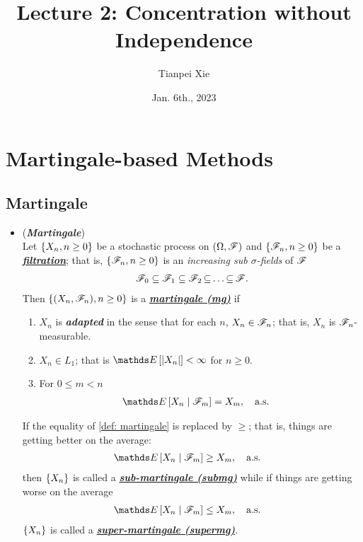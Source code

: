 \documentclass[11pt]{article}
\begin{document}
\title{Lecture 2: Concentration without Independence}
\author{ Tianpei Xie}
\date{Jan. 6th., 2023 }
\maketitle
\tableofcontents
\newpage
\section{Martingale-based Methods}
\subsection{Martingale}
\begin{itemize}
\item \begin{definition} (\emph{\textbf{Martingale}}) \citep{resnick2013probability}\\
Let $\left\{X_n, n \ge 0\right\}$ be a stochastic process on $(\Omega, {\mathscr F})$ and $\left\{{\mathscr F}_n, n \ge 0\right\}$ be a \underline{\textbf{\emph{filtration}}}; that is, $\left\{{\mathscr F}_n, n \ge 0\right\}$ is an \emph{increasing sub $\sigma$-fields} of ${\mathscr F}$
\begin{align*}
{\mathscr F}_0 \subseteq {\mathscr F}_1 \subseteq {\mathscr F}_2 \,{\subseteq}\ldots{\subseteq}\, {\mathscr F}.
\end{align*} Then $\left\{ (X_n, {\mathscr F}_n),  n \ge 0\right\}$ is a \underline{\emph{\textbf{martingale (mg)}}} if
\begin{enumerate}
\item  $X_n$ is \emph{\textbf{adapted}} in the sense that for each $n$, $X_n \in {\mathscr F}_n$; that is, $X_n$ is ${\mathscr F}_n$-measurable.
\item  $X_n \in L_1$; that is $\E{}{\abs{X_n}} < \infty$ for $n \ge 0$.
\item For $0 \le m < n$
\begin{align}
\E{}{X_n \;|\; \srF_m} &= X_m, \quad \text{a.s.} \label{def: martingale}
\end{align}
\end{enumerate}
If the equality of \eqref{def: martingale} is replaced by $\ge$; that is, things are getting better on the average:
\begin{align}
\E{}{X_n \;|\; \srF_m} &\ge X_m, \quad \text{a.s.} \label{def: sub_martingale}
\end{align} then $\left\{X_n\right\}$ is called a \underline{\emph{\textbf{sub-martingale (submg)}}} while if things are getting worse on
the average
\begin{align}
\E{}{X_n \;|\; \srF_m} &\le X_m, \quad \text{a.s.} \label{def: sup_martingale}
\end{align}  $\left\{X_n\right\}$ is called a \underline{\emph{\textbf{super-martingale (supermg)}}}.
\end{definition}


\end{itemize}
\end{document}
